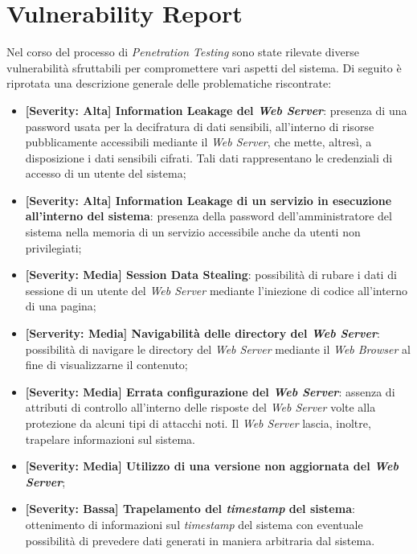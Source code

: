 \documentclass[a4paper,11pt,oneside,top=3cm,bottom=3cm,left=3.5cm,right=3.5cm,openright,reqno,table]{book}
\begin{document}
\section{Vulnerability Report}
Nel corso del processo di \emph{Penetration Testing} sono state rilevate diverse vulnerabilità sfruttabili per compromettere vari aspetti del sistema. Di seguito è riprotata una descrizione generale delle problematiche riscontrate:
\begin{itemize}
    \item \textbf{[Severity: Alta] Information Leakage del \emph{Web Server}}: presenza di una password usata per la decifratura di dati sensibili, all'interno di risorse pubblicamente accessibili mediante il \emph{Web Server}, che mette, altresì, a disposizione i dati sensibili cifrati. Tali dati rappresentano le credenziali di accesso di un utente del sistema;
    \item \textbf{[Severity: Alta] Information Leakage di un servizio in esecuzione all'interno del sistema}: presenza della password dell'amministratore del sistema nella memoria di un servizio accessibile anche da utenti non privilegiati;
    \item \textbf{[Severity: Media] Session Data Stealing}: possibilità di rubare i dati di sessione di un utente del \emph{Web Server} mediante l'iniezione di codice all'interno di una pagina;
    \item \textbf{[Serverity: Media] Navigabilità delle directory del \emph{Web Server}}: possibilità di navigare le directory del \emph{Web Server} mediante il \emph{Web Browser} al fine di visualizzarne il contenuto;
    \item \textbf{[Severity: Media] Errata configurazione del \emph{Web Server}}: assenza di attributi di controllo all'interno delle risposte del \emph{Web Server} volte alla protezione da alcuni tipi di attacchi noti. Il \emph{Web Server} lascia, inoltre, trapelare informazioni sul sistema. 
    \item \textbf{[Severity: Media] Utilizzo di una versione non aggiornata del \emph{Web Server}};
    \item \textbf{[Severity: Bassa] Trapelamento del \emph{timestamp} del sistema}: ottenimento di informazioni sul \emph{timestamp} del sistema con eventuale possibilità di prevedere dati generati in maniera arbitraria dal sistema.
\end{itemize}
\end{document}
